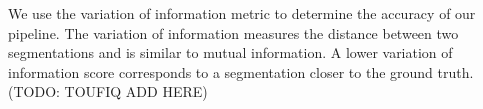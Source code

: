We use the variation of information metric to determine the accuracy of our pipeline. The variation of information measures the distance between two segmentations and is similar to mutual information. A lower variation of information score corresponds to a segmentation closer to the ground truth. (TODO: TOUFIQ ADD HERE)












